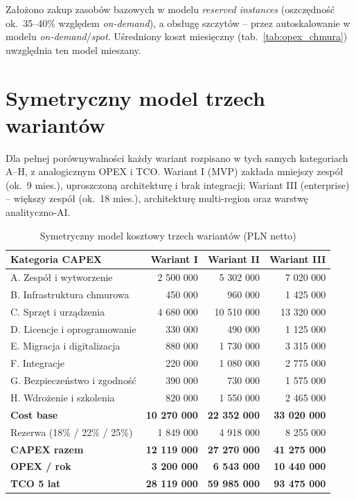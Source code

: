 Założono zakup zasobów bazowych w modelu \textit{reserved instances} (oszczędność ok.~35--40\% względem \textit{on-demand}), a obsługę szczytów -- przez autoskalowanie w modelu \textit{on-demand}/\textit{spot}. Uśredniony koszt miesięczny (tab.~\ref{tab:opex_chmura}) uwzględnia ten model mieszany.

\section{Symetryczny model trzech wariantów}

Dla pełnej porównywalności każdy wariant rozpisano w tych samych kategoriach A--H, z analogicznym OPEX i TCO. Wariant I (MVP) zakłada mniejszy zespół (ok.~9 mies.), uproszczoną architekturę i brak integracji; Wariant III (enterprise) -- większy zespół (ok.~18 mies.), architekturę multi-region oraz warstwę analityczno-AI.

\begin{table}[h]
\centering
\small
\renewcommand{\arraystretch}{1.2}
\begin{tabular}{|L{6.2cm}|r|r|r|}
\hline
{}\textbf{Kategoria CAPEX} & \textbf{Wariant I} & \textbf{Wariant II} & \textbf{Wariant III} \\
\hline
A. Zespół i wytworzenie & 2 500 000 & 5 302 000 & 7 020 000 \\
\hline
B. Infrastruktura chmurowa & 450 000 & 960 000 & 1 425 000 \\
\hline
C. Sprzęt i urządzenia & 4 680 000 & 10 510 000 & 13 320 000 \\
\hline
D. Licencje i oprogramowanie & 330 000 & 490 000 & 1 125 000 \\
\hline
E. Migracja i digitalizacja & 880 000 & 1 730 000 & 3 315 000 \\
\hline
F. Integracje & 220 000 & 1 080 000 & 2 775 000 \\
\hline
G. Bezpieczeństwo i zgodność & 390 000 & 730 000 & 1 575 000 \\
\hline
H. Wdrożenie i szkolenia & 820 000 & 1 550 000 & 2 465 000 \\
\hline
{}\textbf{Cost base} & \textbf{10 270 000} & \textbf{22 352 000} & \textbf{33 020 000} \\
\hline
Rezerwa (18\% / 22\% / 25\%) & 1 849 000 & 4 918 000 & 8 255 000 \\
\hline
{}\textbf{CAPEX razem} & \textbf{12 119 000} & \textbf{27 270 000} & \textbf{41 275 000} \\
\hline
\textbf{OPEX / rok} & \textbf{3 200 000} & \textbf{6 543 000} & \textbf{10 440 000} \\
\hline
{}\textbf{TCO 5 lat} & \textbf{28 119 000} & \textbf{59 985 000} & \textbf{93 475 000} \\
\hline
\end{tabular}
\caption{Symetryczny model kosztowy trzech wariantów (PLN netto)}
\label{tab:trzy_warianty}
\end{table}

